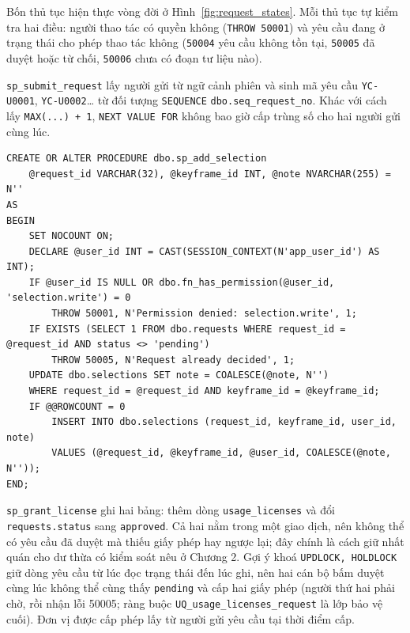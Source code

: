 Bốn thủ tục hiện thực vòng đời ở Hình~\ref{fig:request_states}. Mỗi thủ tục tự kiểm tra hai
điều: người thao tác có quyền không (\texttt{THROW 50001}) và yêu cầu đang ở trạng thái
cho phép thao tác không (\texttt{50004} yêu cầu không tồn tại, \texttt{50005} đã duyệt hoặc
từ chối, \texttt{50006} chưa có đoạn tư liệu nào).

\texttt{sp\_submit\_request} lấy người gửi từ ngữ cảnh phiên và sinh mã yêu cầu
\texttt{YC-U0001}, \texttt{YC-U0002}\dots{} từ đối tượng \texttt{SEQUENCE}
\texttt{dbo.seq\_request\_no}. Khác với cách lấy \texttt{MAX(...) + 1}, \texttt{NEXT VALUE FOR}
không bao giờ cấp trùng số cho hai người gửi cùng lúc.

\begin{lstlisting}[caption={sp\_add\_selection: quyền và trạng thái kiểm tra ngay trong CSDL}, label={lst:add_selection}]
CREATE OR ALTER PROCEDURE dbo.sp_add_selection
    @request_id VARCHAR(32), @keyframe_id INT, @note NVARCHAR(255) = N''
AS
BEGIN
    SET NOCOUNT ON;
    DECLARE @user_id INT = CAST(SESSION_CONTEXT(N'app_user_id') AS INT);
    IF @user_id IS NULL OR dbo.fn_has_permission(@user_id, 'selection.write') = 0
        THROW 50001, N'Permission denied: selection.write', 1;
    IF EXISTS (SELECT 1 FROM dbo.requests WHERE request_id = @request_id AND status <> 'pending')
        THROW 50005, N'Request already decided', 1;
    UPDATE dbo.selections SET note = COALESCE(@note, N'')
    WHERE request_id = @request_id AND keyframe_id = @keyframe_id;
    IF @@ROWCOUNT = 0
        INSERT INTO dbo.selections (request_id, keyframe_id, user_id, note)
        VALUES (@request_id, @keyframe_id, @user_id, COALESCE(@note, N''));
END;
\end{lstlisting}

\texttt{sp\_grant\_license} ghi hai bảng: thêm dòng \texttt{usage\_licenses} và đổi
\texttt{requests.status} sang \texttt{approved}. Cả hai nằm trong một giao dịch, nên không
thể có yêu cầu đã duyệt mà thiếu giấy phép hay ngược lại; đây chính là cách giữ nhất quán
cho dư thừa có kiểm soát nêu ở Chương 2. Gợi ý khoá \texttt{UPDLOCK, HOLDLOCK} giữ dòng yêu cầu
từ lúc đọc trạng thái đến lúc ghi, nên hai cán bộ bấm duyệt cùng lúc không thể cùng thấy
\texttt{pending} và cấp hai giấy phép (người thứ hai phải chờ, rồi nhận lỗi 50005; ràng buộc
\texttt{UQ\_usage\_licenses\_request} là lớp bảo vệ cuối). Đơn vị được cấp phép lấy từ
người gửi yêu cầu tại thời điểm cấp.

